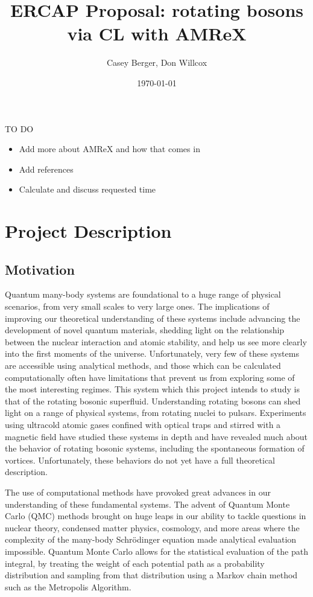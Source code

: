 \documentclass[onecolumn, 12pt]{report}
\title{ERCAP Proposal: rotating bosons via CL with AMReX}
\author{Casey Berger, Don Willcox}
\date{\today}
\begin{document}
TO DO
\begin{itemize}
	\item Add more about AMReX and how that comes in
	\item Add references
	\item Calculate and discuss requested time
\end{itemize}
\section{Project Description}

\subsection{Motivation}
Quantum many-body systems are foundational to a huge range of physical scenarios, from very small scales to very large ones. The implications of improving our theoretical understanding of these systems include advancing the development of novel quantum materials, shedding light on the relationship between the nuclear interaction and atomic stability, and help us see more clearly into the first moments of the universe. Unfortunately, very few of these systems are accessible using analytical methods, and those which can be calculated computationally often have limitations that prevent us from exploring some of the most interesting regimes. This system which this project intends to study is that of the rotating bosonic superfluid. Understanding rotating bosons can shed light on a range of physical systems, from rotating nuclei to pulsars. Experiments using ultracold atomic gases confined with optical traps and stirred with a magnetic field have studied these systems in depth and have revealed much about the behavior of rotating bosonic systems, including the spontaneous formation of vortices. Unfortunately, these behaviors do not yet have a full theoretical description.

The use of computational methods have provoked great advances in our understanding of these fundamental systems. The advent of Quantum Monte Carlo (QMC) methods brought on huge leaps in our ability to tackle questions in nuclear theory, condensed matter physics, cosmology, and more areas where the complexity of the many-body Schr\"{o}dinger equation made analytical evaluation impossible. Quantum Monte Carlo allows for the statistical evaluation of the path integral, by treating the weight of each potential path as a probability distribution and sampling from that distribution using a Markov chain method such as the Metropolis Algorithm. 
\end{document}
